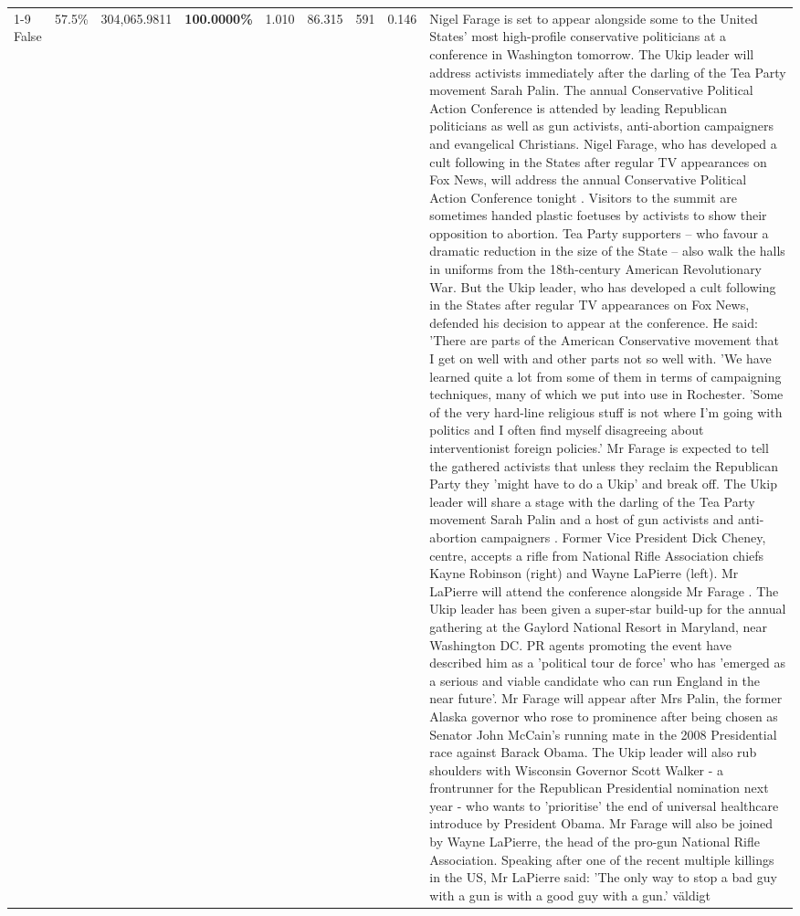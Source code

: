 \begin{table}[H]
\begin{tabular}{lllrlllll}
\cline{1-9} \cline{2-9}
False & 57.5\% & \color{red} 304,065.9811 & \bfseries \color{red} 100.0000\% & 1.010 & 86.315 & 591 & 0.146 & Nigel Farage is set to appear alongside some to the United States' most high-profile conservative politicians at a conference in Washington tomorrow. The Ukip leader will address activists immediately after the darling of the Tea Party movement Sarah Palin. The annual Conservative Political Action Conference is attended by leading Republican politicians as well as gun activists, anti-abortion campaigners and evangelical Christians. Nigel Farage, who has developed a cult following in the States after regular TV appearances on Fox News, will address the annual Conservative Political Action Conference tonight . Visitors to the summit are sometimes handed plastic foetuses by activists to show their opposition to abortion. Tea Party supporters – who favour a dramatic reduction in the size of the State – also walk the halls in uniforms from the 18th-century American Revolutionary War. But the Ukip leader, who has developed a cult following in the States after regular TV appearances on Fox News, defended his decision to appear at the conference. He said: 'There are parts of the American Conservative movement that I get on well with and other parts not so well with. 'We have learned quite a lot from some of them in terms of campaigning techniques, many of which we put into use in Rochester. 'Some of the very hard-line religious stuff is not where I'm going with politics and I often find myself disagreeing about interventionist foreign policies.' Mr Farage is expected to tell the gathered activists that unless they reclaim the Republican Party they 'might have to do a Ukip' and break off. The Ukip leader will share a stage with the darling of the Tea Party movement Sarah Palin and a host of gun activists and anti-abortion campaigners . Former Vice President Dick Cheney, centre, accepts a rifle from National Rifle Association chiefs Kayne Robinson (right) and Wayne LaPierre (left). Mr LaPierre will attend the conference alongside Mr Farage . The Ukip leader has been given a super-star build-up for the annual gathering at the Gaylord National Resort in Maryland, near Washington DC. PR agents promoting the event have described him as a 'political tour de force' who has 'emerged as a serious and viable candidate who can run England in the near future'. Mr Farage will appear after Mrs Palin, the former Alaska governor who rose to prominence after being chosen as Senator John McCain's running mate in the 2008 Presidential race against Barack Obama. The Ukip leader will also rub shoulders with Wisconsin Governor Scott Walker - a frontrunner for the Republican Presidential nomination next year - who wants to 'prioritise' the end of universal healthcare introduce by President Obama. Mr Farage will also be joined by Wayne LaPierre, the head of the pro-gun National Rifle Association. Speaking after one of the recent multiple killings in the US, Mr LaPierre said: 'The only way to stop a bad guy with a gun is with a good guy with a gun.' väldigt \\

\end{tabular}
\end{table}
